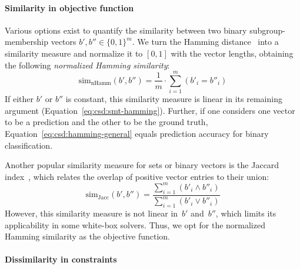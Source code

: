 \documentclass[acmsmall]{acmart} %
\theoremstyle{acmplain}
\theoremstyle{acmdefinition}
\begin{document}
\paragraph{Similarity in objective function}

Various options exist to quantify the similarity between two binary subgroup-membership vectors $b', b'' \in \{0, 1\}^m$.
We turn the Hamming distance~\cite{choi2010survey} into a similarity measure and normalize it to $[0, 1]$ with the vector lengths, obtaining the following \emph{normalized Hamming similarity}:
%
\begin{equation}
	\text{sim}_{\text{nHamm}}(b', b'') = \frac{1}{m} \cdot \sum_{i=1}^{m} (b'_i = b''_i)
	\label{eq:csd:hamming-general}
\end{equation}
%
If either $b'$ or $b''$ is constant, this similarity measure is linear in its remaining argument (Equation~\ref{eq:csd:smt-hamming}).
Further, if one considers one vector to be a prediction and the other to be the ground truth, Equation~\ref{eq:csd:hamming-general} equals prediction accuracy for binary classification.

Another popular similarity measure for sets or binary vectors is the Jaccard index~\cite{choi2010survey}, which relates the overlap of positive vector entries to their union:
%
\begin{equation}
	\text{sim}_{\text{Jacc}}(b', b'') = \frac{\sum_{i=1}^{m} (b'_i \land b''_i)}{\sum_{i=1}^{m} (b'_i \lor b''_i)}
	\label{eq:csd:jaccard}
\end{equation}
%
However, this similarity measure is not linear in~$b'$ and~$b''$, which limits its applicability in some white-box solvers. 
Thus, we opt for the normalized Hamming similarity as the objective function.

\paragraph{Dissimilarity in constraints}
\end{document}
